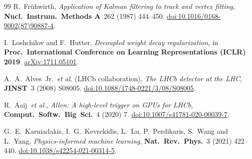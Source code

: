 \documentclass[a4paper,11pt]{article}
\begin{document}
\begin{thebibliography}{99}
R.~Fr\"uhwirth,
\emph{Application of Kalman filtering to track and vertex fitting},
\textbf{Nucl.~Instrum.~Methods A}~262 (1987) 444--450.
\href{https://doi.org/10.1016/0168-9002(87)90887-4}{doi:10.1016/0168-9002(87)90887-4}.

I.~Loshchilov and F.~Hutter,
\emph{Decoupled weight decay regularization},
in \textbf{Proc.~International Conference on Learning Representations
(ICLR) 2019}.
\href{https://arxiv.org/abs/1711.05101}{arXiv:1711.05101}.

A.~A.~Alves~Jr.~\textit{et al.} (LHCb collaboration),
\emph{The LHCb detector at the LHC},
\textbf{JINST}~3 (2008) S08005.
\href{https://doi.org/10.1088/1748-0221/3/08/S08005}{doi:10.1088/1748-0221/3/08/S08005}.

R.~Aaij~\textit{et al.},
\emph{Allen: A high-level trigger on GPUs for LHCb},
\textbf{Comput.~Softw.~Big~Sci.}~4 (2020) 7.
\href{https://doi.org/10.1007/s41781-020-00039-7}{doi:10.1007/s41781-020-00039-7}.

G.~E.~Karniadakis, I.~G.~Kevrekidis, L.~Lu, P.~Perdikaris, S.~Wang and L.~Yang,
\emph{Physics-informed machine learning},
\textbf{Nat.~Rev.~Phys.}~3 (2021) 422--440.
\href{https://doi.org/10.1038/s42254-021-00314-5}{doi:10.1038/s42254-021-00314-5}.

\end{thebibliography}

%
\end{document}

